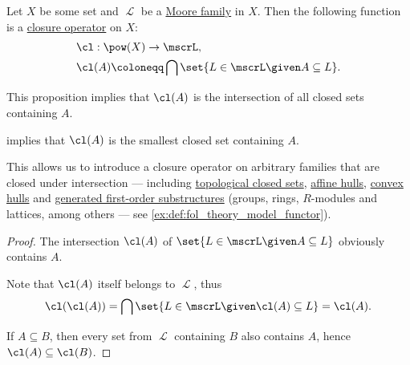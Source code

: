 \begin{proposition}\label{thm:moore_family_closure_operator}
  Let \( X \) be some set and \( \mscrL \) be a \hyperref[def:moore_family]{Moore family} in \( X \). Then the following function is a \hyperref[def:abstract_closure_operator]{closure operator} on \( X \):
  \begin{equation*}
    \begin{aligned}
      &\cl: \pow(X) \to \mscrL, \\
      &\cl(A) \coloneqq \bigcap \set{ L \in \mscrL \given A \subseteq L }. \\
    \end{aligned}
  \end{equation*}
\end{proposition}
\begin{comments}
  \item This proposition implies that \( \cl(A) \) is the intersection of all closed sets containing \( A \).
  \item {} implies that \( \cl(A) \) is the smallest closed set containing \( A \).
  \item This allows us to introduce a closure operator on arbitrary families that are closed under intersection --- including \hyperref[def:topological_space]{topological closed sets}, \hyperref[def:affine_hull]{affine hulls}, \hyperref[def:convex_hull]{convex hulls} and \hyperref[def:fol_generated_substructure]{generated first-order substructures} (groups, rings, \( R \)-modules and lattices, among others --- see \cref{ex:def:fol_theory_model_functor}).
\end{comments}
\begin{proof}
   The intersection \( \cl(A) \) of \( \set{ L \in \mscrL \given A \subseteq L } \) obviously contains \( A \).

   Note that \( \cl(A) \) itself belongs to \( \mscrL \), thus
  \begin{equation*}
    \cl(\cl(A)) = \bigcap \set{ L \in \mscrL \given \cl(A) \subseteq L } = \cl(A).
  \end{equation*}

   If \( A \subseteq B \), then every set from \( \mscrL \) containing \( B \) also contains \( A \), hence \( \cl(A) \subseteq \cl(B) \).
\end{proof}

